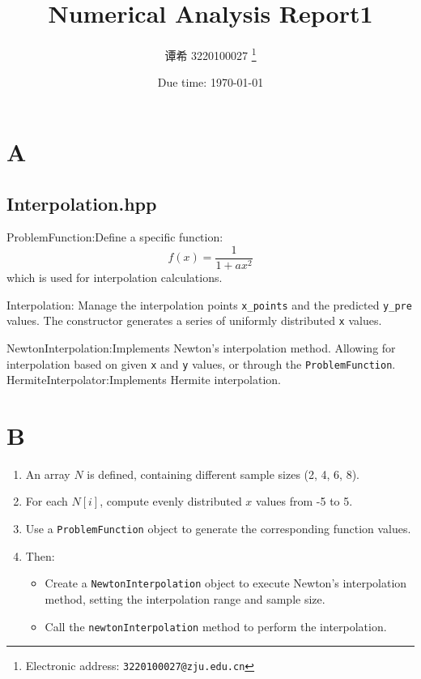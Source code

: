 \documentclass[a4paper]{article}
\begin{document}
\title{Numerical Analysis Report1}

\author{谭希 3220100027
  \thanks{Electronic address: \texttt{3220100027@zju.edu.cn}}}


\date{Due time: \today}

\maketitle

\section{A}
\subsection{Interpolation.hpp}

ProblemFunction:Define a specific function:
\[
f(x) = \frac{1}{1 + ax^2}
\]
which is used for interpolation calculations.

Interpolation:
Manage the interpolation points \texttt{x\_points} and the predicted \texttt{y\_pre} values. The constructor generates a series of uniformly distributed \texttt{x} values.

NewtonInterpolation:Implements Newton's interpolation method. Allowing for interpolation based on given \texttt{x} and \texttt{y} values, or through the \texttt{ProblemFunction}.
HermiteInterpolator:Implements Hermite interpolation.

\section{B}
\begin{enumerate}
    \item An array \( N \) is defined, containing different sample sizes (2, 4, 6, 8).
    \item For each \( N[i] \), compute evenly distributed \( x \) values from -5 to 5.
    \item Use a \texttt{ProblemFunction} object to generate the corresponding function values.
    \item Then:
    \begin{itemize}
        \item Create a \texttt{NewtonInterpolation} object to execute Newton's interpolation method, setting the interpolation range and sample size.
        \item Call the \texttt{newtonInterpolation} method to perform the interpolation.
    \end{itemize}
\end{enumerate}
\end{document}
